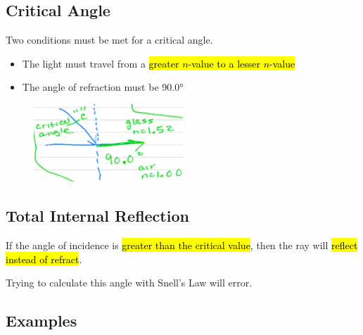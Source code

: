 \documentclass[a4paper,12pt]{article}
\begin{document}
\subsection{Critical Angle}
Two conditions must be met for a critical angle.
\begin{itemize}
    \item{The light must travel from a \hl{greater $n$-value to a lesser $n$-value}}
    \item{The angle of refraction must be \ang{90.0}}
\end{itemize}
\begin{figure}[H]
    \centering
    \includegraphics[width=0.50\textwidth]{criticalangle}
\end{figure}

\subsection{Total Internal Reflection}
If the angle of incidence is \hl{greater than the critical value}, then the ray will \hl{reflect instead of refract}.

Trying to calculate this angle with Snell's Law will error.

\subsection{Examples}
\end{document}
